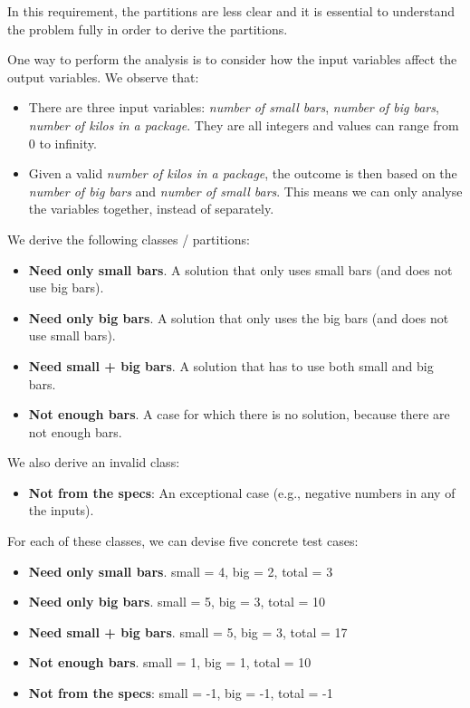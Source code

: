 In this requirement, the partitions are less clear and it is essential
to understand the problem fully in order to derive the partitions.

One way to perform the analysis is to consider how the input variables
affect the output variables. We observe that:

\begin{itemize}
\tightlist
\item
  There are three input variables: \emph{number of small bars},
  \emph{number of big bars}, \emph{number of kilos in a package}. They
  are all integers and values can range from 0 to infinity.
\item
  Given a valid \emph{number of kilos in a package}, the outcome is then
  based on the \emph{number of big bars} and \emph{number of small
  bars}. This means we can only analyse the variables together, instead
  of separately.
\end{itemize}

We derive the following classes / partitions:

\begin{itemize}
\tightlist
\item
  \textbf{Need only small bars}. A solution that only uses small bars
  (and does not use big bars).
\item
  \textbf{Need only big bars}. A solution that only uses the big bars
  (and does not use small bars).
\item
  \textbf{Need small + big bars}. A solution that has to use both small
  and big bars.
\item
  \textbf{Not enough bars}. A case for which there is no solution,
  because there are not enough bars.
\end{itemize}

We also derive an invalid class:

\begin{itemize}
\tightlist
\item
  \textbf{Not from the specs}: An exceptional case (e.g., negative
  numbers in any of the inputs).
\end{itemize}

For each of these classes, we can devise five concrete test cases:

\begin{itemize}
\tightlist
\item
  \textbf{Need only small bars}. small = 4, big = 2, total = 3
\item
  \textbf{Need only big bars}. small = 5, big = 3, total = 10
\item
  \textbf{Need small + big bars}. small = 5, big = 3, total = 17
\item
  \textbf{Not enough bars}. small = 1, big = 1, total = 10
\item
  \textbf{Not from the specs}: small = -1, big = -1, total = -1
\end{itemize}

